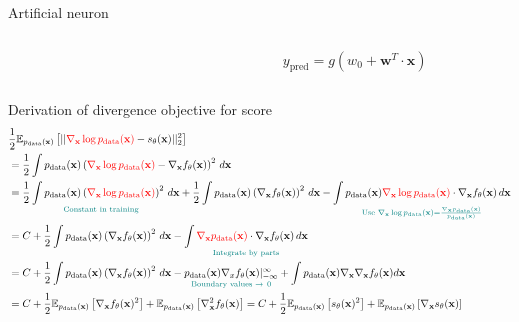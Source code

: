 \documentclass[aspectratio=169,xcolor=dvipsnames]{beamer}
\newcommand{\bx}{\mathbf{x}}
\newcommand{\nbx}{\nabla_{\bx}}
\begin{document}
\begin{frame}{Artificial neuron}
\begin{columns}
\begin{column}{0.75\textwidth}

  \end{column}
  \begin{column}{0.25\textwidth}
    \[
    y_\text{pred} = g(w_0 + \mathbf{w}^T \cdot \mathbf{x})
    \]
  \end{column}
\end{columns}
\end{frame}


\begin{frame}{Derivation of divergence objective for score}
  \small
  \begin{align*}
    &\frac{1}{2}\mathbb{E}_{p_\text{data}(\bx)} \left[ || \textcolor{red}{\nbx \log p_\text{data}(\bx)} - s_\theta(\bx) ||_2^2\right]\\
    &= \frac{1}{2} \int p_\text{data}(\bx) \left(\textcolor{red}{\nbx \log p_\text{data}(\bx)} - \nbx f_\theta(\bx) \right)^2 \,d\bx\\
    &= \underset{\textcolor{teal}{{\text{Constant in training}}}}{\frac{1}{2} \int p_\text{data}(\bx) \left(\textcolor{red}{\nbx \log p_\text{data}(\bx)}\right)^2 \,d\bx
    }+ \frac{1}{2} \int p_\text{data}(\bx) \left(\nbx f_\theta(\bx) \right)^2 \,d\bx - \underset{
    \textcolor{teal}{\text{Use }\nbx \log p_\text{data}(\bx) = \frac{\nbx p_\text{data}(\bx)}{p_\text{data}(\bx)}}  
    }
    {\int p_\text{data}(\bx) \textcolor{red}{\nbx \log p_\text{data}(\bx)} \cdot \nbx f_\theta(\bx) \,d\bx}\\
    &= C + \frac{1}{2} \int p_\text{data}(\bx) \left(\nbx f_\theta(\bx) \right)^2 \,d\bx - \underset{\textcolor{teal}{\text{Integrate by parts}}}{\int \textcolor{red}{\nbx p_\text{data}(\bx)}  \cdot \nbx f_\theta (\bx) \,d \bx}\\
    &=  C + \frac{1}{2} \int p_\text{data}(\bx) \left(\nbx f_\theta(\bx) \right)^2 \,d\bx - \underset{\textcolor{teal}{\text{Boundary values } \to~ 0}}{p_\text{data}(\bx) \nabla_x f_\theta(\bx)|_{-\infty}^{\infty}}  + \int p_\text{data}(\bx) \nbx \nbx f_\theta(\bx) d \bx\\
    &= C + \frac{1}{2} \mathbb{E}_{p_\text{data}(\bx)} \left[\nbx f_\theta(\bx)^2\right] +\mathbb{E}_{p_\text{data}(\bx)} \left[ \nbx^2 f_\theta(\bx)\right] = C + \frac{1}{2}\mathbb{E}_{p_\text{data}(\bx)} \left[ s_\theta(\bx)^2\right] + \mathbb{E}_{p_\text{data}(\bx)}\left[\nbx s_\theta(\bx) \right]
  \end{align*}
\end{frame}
\end{document}
